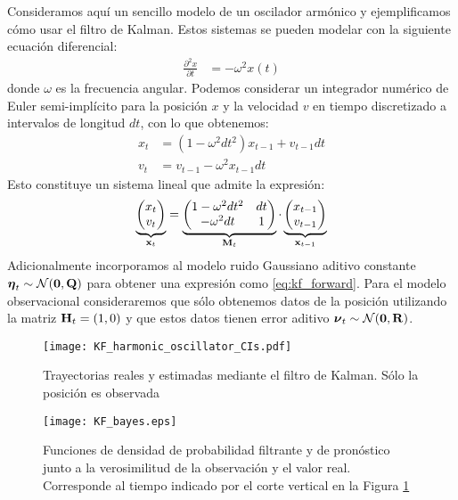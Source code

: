 Consideramos aquí un sencillo modelo de un oscilador armónico y ejemplificamos cómo usar el filtro de Kalman. Estos sistemas se pueden modelar con la siguiente ecuación diferencial:
\begin{align*}
    \frac{\partial^2 x}{\partial t} &= -\omega^2 x(t)
\end{align*}
donde $\omega$ es la frecuencia angular. Podemos considerar un integrador numérico de Euler semi-implícito para la posición $x$ y la velocidad $v$ en tiempo discretizado a intervalos de longitud $dt$, con lo que obtenemos:
\begin{align*}
    x_t &= (1 - \omega^2 dt^2) x_{t-1} + v_{t-1} dt \\
    v_t &= v_{t-1} - \omega^2 x_{t-1} dt
\end{align*}
Esto constituye un sistema lineal que admite la expresión:
\begin{align}
\underbrace{\begin{pmatrix*}
        x_t \\
        v_t
    \end{pmatrix*}}_{\v x_t} = 
\underbrace{\begin{pmatrix*}
        1 - \omega^2 dt^2 & dt \\
        -\omega^2 dt & 1
    \end{pmatrix*}}_{\v M_t} \cdot
\underbrace{\begin{pmatrix*}
        x_{t-1} \\
        v_{t-1}
    \end{pmatrix*}}_{\v x_{t-1}} \label{eq:oscillator_matrix_eq}
\end{align}
Adicionalmente incorporamos al modelo ruido Gaussiano aditivo constante $\mbox{\boldmath$ \eta $}_t \sim \mathcal{N}(\mathbf{0}, \mathbf{Q})$ para obtener una expresión como \ref{eq:kf_forward}. Para el modelo observacional consideraremos que sólo obtenemos datos de la posición utilizando la matriz $\mathbf{H}_t = (1, 0)$ y que estos datos tienen error aditivo $\mbox{\boldmath$ \nu $}_t \sim \mathcal{N}(\mathbf{0}, \mathbf{R})$.

\begin{figure}[t]
    \centering
    \texttt{[image: KF\_harmonic\_oscillator\_CIs.pdf]}
    \caption{Trayectorias reales y estimadas mediante el filtro de Kalman. Sólo la posición es observada}
    \label{fig:KF_harmonic_oscillator}
\end{figure}

\begin{figure}[h]
    \centering
    \texttt{[image: KF\_bayes.eps]}
    \caption{Funciones de densidad de probabilidad filtrante y de pronóstico junto a la verosimilitud de la observación y el valor real. Corresponde al tiempo indicado por el corte vertical en la Figura \ref{fig:KF_harmonic_oscillator}}
    \label{fig:KF_bayes}
\end{figure}

